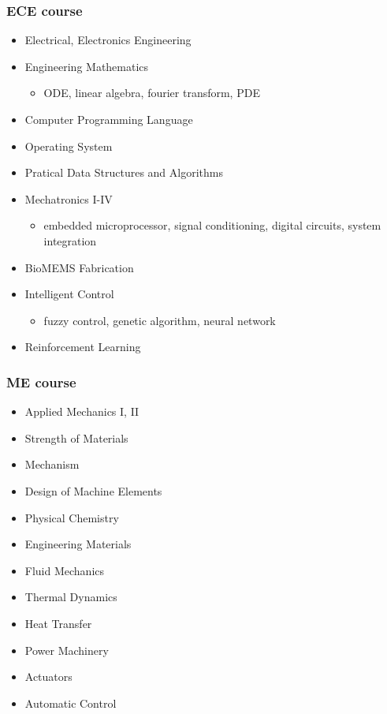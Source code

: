 \documentclass[compress, aspectratio=32]{beamer}
\begin{document}
\begin{frame}
    \frametitle{ECE course}
    \begin{itemize}
        \item Electrical, Electronics Engineering
        \item Engineering Mathematics
              \begin{itemize}
                  \item ODE, linear algebra, fourier transform, PDE
              \end{itemize}
        \item Computer Programming Language
        \item Operating System
        \item Pratical Data Structures and Algorithms
        \item Mechatronics I-IV
              \begin{itemize}
                  \item embedded microprocessor, signal conditioning, digital circuits, system integration
              \end{itemize}
        \item BioMEMS Fabrication
        \item Intelligent Control
              \begin{itemize}
                  \item fuzzy control, genetic algorithm, neural network
              \end{itemize}
        \item Reinforcement Learning
    \end{itemize}
\end{frame}

\begin{frame}
    \frametitle{ME course}
    \begin{multicols}{2}
        \begin{itemize}
            \item Applied Mechanics I, II
            \item Strength of Materials
            \item Mechanism
            \item Design of Machine Elements
            \item Physical Chemistry
            \item Engineering Materials
            \item Fluid Mechanics
            \item Thermal Dynamics
            \item Heat Transfer
            \item Power Machinery
            \item Actuators
            \item Automatic Control
        \end{itemize}
    \end{multicols}
\end{frame}
\end{document}
